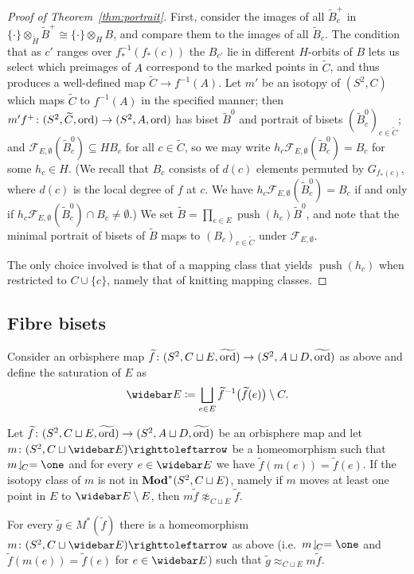 \documentclass{amsart}
\newcommand\Forget{{\mathcal F}}
\newcommand\Push{{\operatorname{push}}}
\newcommand\wtf{{\widetilde f}}
\newcommand\wtg{{\widetilde g}}
\newcommand\wtB{{\widetilde B}}
\newcommand\wtC{{\widetilde C}}
\newcommand\wtH{{\widetilde H}}
\newcommand\wtord{{\widetilde\ord}}
\begin{document}
\begin{proof}[Proof of Theorem~\ref{thm:portrait}]
  First, consider the images of all $\wtB_c^+$ in
  $\{\cdot\}\otimes_\wtH\wtB^+\cong\{\cdot\}\otimes_H B$, and compare
  them to the images of all $\wtB_c$. The condition that as $c'$
  ranges over $f_*^{-1}(f_*(c))$ the $B_{c'}$ lie in different
  $H$-orbits of $B$ lets us select which preimages of $A$ correspond
  to the marked points in $\wtC$, and thus produces a well-defined map
  $\wtC\to f^{-1}(A)$. Let $m'$ be an isotopy of $(S^2,C)$ which maps
  $\wtC$ to $f^{-1}(A)$ in the specified manner; then
  $m' f^+\colon(S^2,\wtC,\ord)\to(S^2,A,\ord )$ has biset $\wtB^0$ and
  portrait of bisets $(\wtB^0_c)_{c\in\wtC}$; and
  $\Forget_{E,\emptyset}(\wtB^0_c)\subseteq H B_c$ for all $c\in\wtC$,
  so we may write $h_c\Forget_{E,\emptyset}(\wtB^0_c)=B_c$ for some
  $h_c\in H$. (We recall that $B_c$ consists of $d(c)$ elements
  permuted by $G_{f_*(c)}$, where $d(c)$ is the local degree of $f$ at
  $c$. We have $h_c\Forget_{E,\emptyset}(\wtB^0_c)=B_c$ if and only if
  $h_c\Forget_{E,\emptyset}(\wtB^0_c)\cap B_c\neq\emptyset$.)  We set
  $\wtB=\prod_{c\in E}\Push(h_c)\wtB^0$, and note that the minimal
  portrait of bisets of $\wtB$ maps to $(B_c)_{c\in\wtC}$ under
  $\Forget_{E,\emptyset}$.

  The only choice involved is that of a mapping class that yields
  $\Push(h_c)$ when restricted to $C\cup\{c\}$, namely that of
  knitting mapping classes.
\end{proof}

\subsection{Fibre bisets}
Consider an orbisphere map
$\wtf\colon (S^2, C\sqcup E,\wtord)\to (S^2, A\sqcup D ,\wtord)$ as above and define
the saturation of $E$ as
\[\widebar E\coloneqq \bigsqcup_{e\in E}\wtf^{-1}\big(\wtf(e)\big)\setminus C.\]

\begin{lem}\label{lem:twisting bar E}
  Let
  $\wtf\colon (S^2,C\sqcup E,\wtord)\to (S^2,A\sqcup
  D,\wtord)$ be an orbisphere map and let
  $m\colon (S^2,C\sqcup \widebar E)\selfmap$ be a homeomorphism such
  that $m\restrict C=\one$ and for every $e\in \widebar E$ we have
  $\wtf(m(e))=\wtf(e)$. If the isotopy class of $m$ is not in
  $\mathbf{\relax Mod}^*(S^2,C\sqcup E)$, namely if $m$ moves at least one point in
  $E$ to $\widebar E\setminus E$, then
  $m \wtf\not\approx_{C\sqcup E}\wtf$.

  For every $\wtg\in M^*(\wtf)$ there is a homeomorphism
  $m\colon (S^2,C\sqcup \widebar E)\selfmap$ as above
  (i.e.~$m\restrict C=\one$ and $\wtf(m(e))=\wtf(e)$ for
  $e\in \widebar E$) such that $\wtg \approx_{C\sqcup E} m\wtf$.
\end{lem}
\end{document}
